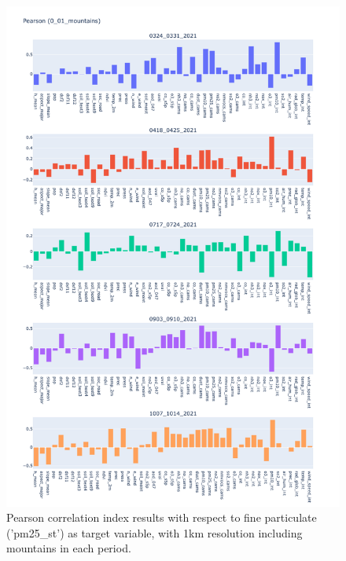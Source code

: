 \begin{figure}[H]
    \centering
    \includegraphics[scale=0.38]{images/tests/0_01_mountainspm25_st_pearson.png}
    \caption{Pearson correlation index results with respect to fine particulate ('pm25\_st') as target variable, with 1km resolution including mountains in each period.}
    
\end{figure}
